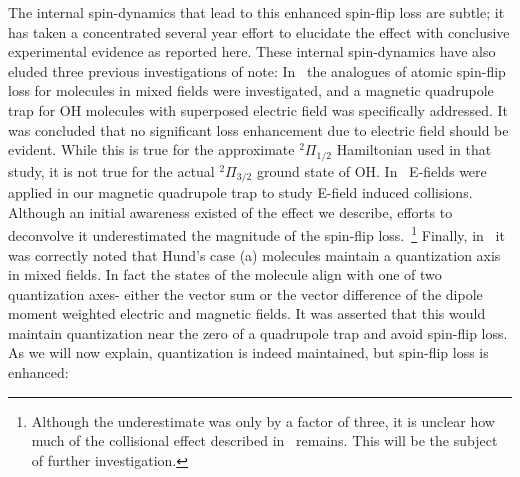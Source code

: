 \documentclass[%
 reprint,
groupedaddress,
 amsmath,amssymb,
 aps,
prl,
]{revtex4-1}
\begin{document}
The internal spin-dynamics that lead to this enhanced spin-flip loss are subtle; it has taken a concentrated several year effort to elucidate the effect with conclusive experimental evidence as reported here. These internal spin-dynamics have also eluded three previous investigations of note: In~\cite{Lara2008} the analogues of atomic spin-flip loss for molecules in mixed fields were investigated, and a magnetic quadrupole trap for OH molecules with superposed electric field was specifically addressed. It was concluded that no significant loss enhancement due to electric field should be evident. While this is true for the approximate $^2\Pi_{1/2}$ Hamiltonian used in that study, it is not true for the actual $^2\Pi_{3/2}$ ground state of OH. In~\cite{Stuhl2013} E-fields were applied in our magnetic quadrupole trap to study E-field induced collisions. Although an initial awareness existed of the effect we describe, efforts to deconvolve it underestimated the magnitude of the spin-flip loss.~\footnote{Although the underestimate was only by a factor of three, it is unclear how much of the collisional effect described in~\cite{Stuhl2013} remains. This will be the subject of further investigation.} Finally, in~\cite{Bohn2013} it was correctly noted that Hund's case (a) molecules maintain a quantization axis in mixed fields. In fact the states of the molecule align with one of two quantization axes- either the vector sum or the vector difference of the dipole moment weighted electric and magnetic fields. It was asserted that this would maintain quantization near the zero of a quadrupole trap and avoid spin-flip loss. As we will now explain, quantization is indeed maintained, but spin-flip loss is enhanced:
\end{document}

